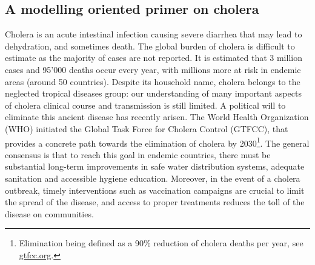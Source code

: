 \begin{fullwidth}
\chapter{A modelling oriented primer on cholera}
\end{fullwidth}
Cholera is an acute intestinal infection causing severe diarrhea that may lead to dehydration, and sometimes death. The global burden of cholera is difficult to estimate as the majority of cases are not reported. It is estimated that 3 million cases and 95'000 deaths occur every year, with millions more at risk in endemic areas (around 50 countries)\cite[-1\baselineskip]{Ali:UpdatedGlobalBurden:2015}. Despite its household name, cholera belongs to the neglected tropical diseases group: our understanding of many important aspects of cholera clinical course and transmission is still limited.
A political will to eliminate this ancient disease has recently arisen. The World Health Organization (WHO) initiated the Global Task Force for Cholera Control (GTFCC), that provides a concrete path towards the elimination of cholera by 2030\footnote[][-3\baselineskip]{Elimination being defined as a 90\% reduction of cholera deaths per year, see \url{gtfcc.org}.}. The general consensus is that to reach this goal in endemic countries, there must be substantial long-term improvements in safe water distribution systems, adequate sanitation and accessible hygiene education. Moreover, in the event of a cholera outbreak, timely interventions such as vaccination campaigns are crucial to limit the spread of the disease, and access to proper treatments reduces the toll of the disease on communities. %


\vspace{.7cm}
